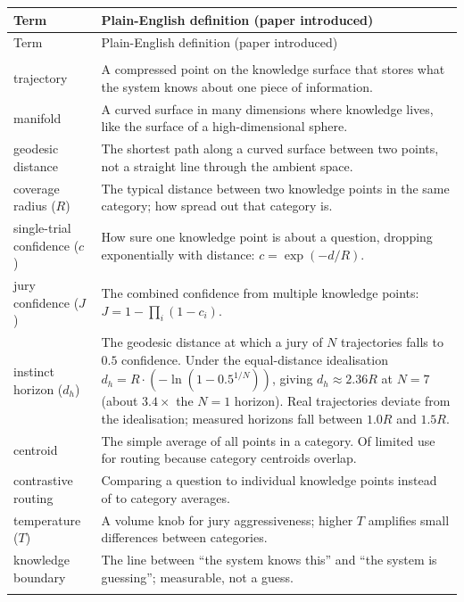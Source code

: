 \documentclass[11pt]{article}
\begin{document}
\begin{longtable}{@{}p{}p{}@{}}
\toprule
Term & Plain-English definition (paper introduced) \\
\midrule
\endfirsthead
\toprule
Term & Plain-English definition (paper introduced) \\
\midrule
\endhead
\bottomrule
\endfoot

\multicolumn{2}{@{}l}{Foundation (Geometric Jury)} \\
\midrule
trajectory & A compressed point on the knowledge surface that stores what the system knows about one piece of information. \\
manifold & A curved surface in many dimensions where knowledge lives, like the surface of a high-dimensional sphere. \\
geodesic distance & The shortest path along a curved surface between two points, not a straight line through the ambient space. \\
coverage radius ($R$) & The typical distance between two knowledge points in the same category; how spread out that category is. \\
single-trial confidence ($c$) & How sure one knowledge point is about a question, dropping exponentially with distance: $c = \exp(-d/R)$. \\
jury confidence ($J$) & The combined confidence from multiple knowledge points: $J = 1 - \prod_i (1 - c_i)$. \\
instinct horizon ($d_h$) & The geodesic distance at which a jury of $N$ trajectories falls to $0.5$ confidence. Under the equal-distance idealisation $d_h = R \cdot (-\ln(1 - 0.5^{1/N}))$, giving $d_h \approx 2.36R$ at $N=7$ (about $3.4\times$ the $N=1$ horizon). Real trajectories deviate from the idealisation; measured horizons fall between $1.0R$ and $1.5R$. \\
centroid & The simple average of all points in a category. Of limited use for routing because category centroids overlap. \\
contrastive routing & Comparing a question to individual knowledge points instead of to category averages. \\
temperature ($T$) & A volume knob for jury aggressiveness; higher $T$ amplifies small differences between categories. \\
knowledge boundary & The line between ``the system knows this'' and ``the system is guessing''; measurable, not a guess. \\
\addlinespace
\multicolumn{2}{@{}l}{Paper I (GRC)} \\

\end{longtable}
\end{document}
